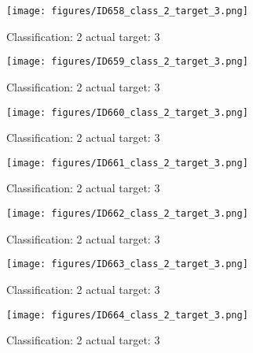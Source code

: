 \begin{figure}[h!]
\begin{center}
\texttt{[image: figures/ID658\_class\_2\_target\_3.png]}
\end{center}
\caption{ Classification: 2 actual target: 3}
\label{fig:ID658_class_2_target_3}
\end{figure}
\begin{figure}[h!]
\begin{center}
\texttt{[image: figures/ID659\_class\_2\_target\_3.png]}
\end{center}
\caption{ Classification: 2 actual target: 3}
\label{fig:ID659_class_2_target_3}
\end{figure}
\begin{figure}[h!]
\begin{center}
\texttt{[image: figures/ID660\_class\_2\_target\_3.png]}
\end{center}
\caption{ Classification: 2 actual target: 3}
\label{fig:ID660_class_2_target_3}
\end{figure}
\begin{figure}[h!]
\begin{center}
\texttt{[image: figures/ID661\_class\_2\_target\_3.png]}
\end{center}
\caption{ Classification: 2 actual target: 3}
\label{fig:ID661_class_2_target_3}
\end{figure}
\begin{figure}[h!]
\begin{center}
\texttt{[image: figures/ID662\_class\_2\_target\_3.png]}
\end{center}
\caption{ Classification: 2 actual target: 3}
\label{fig:ID662_class_2_target_3}
\end{figure}
\begin{figure}[h!]
\begin{center}
\texttt{[image: figures/ID663\_class\_2\_target\_3.png]}
\end{center}
\caption{ Classification: 2 actual target: 3}
\label{fig:ID663_class_2_target_3}
\end{figure}
\begin{figure}[h!]
\begin{center}
\texttt{[image: figures/ID664\_class\_2\_target\_3.png]}
\end{center}
\caption{ Classification: 2 actual target: 3}
\label{fig:ID664_class_2_target_3}
\end{figure}
